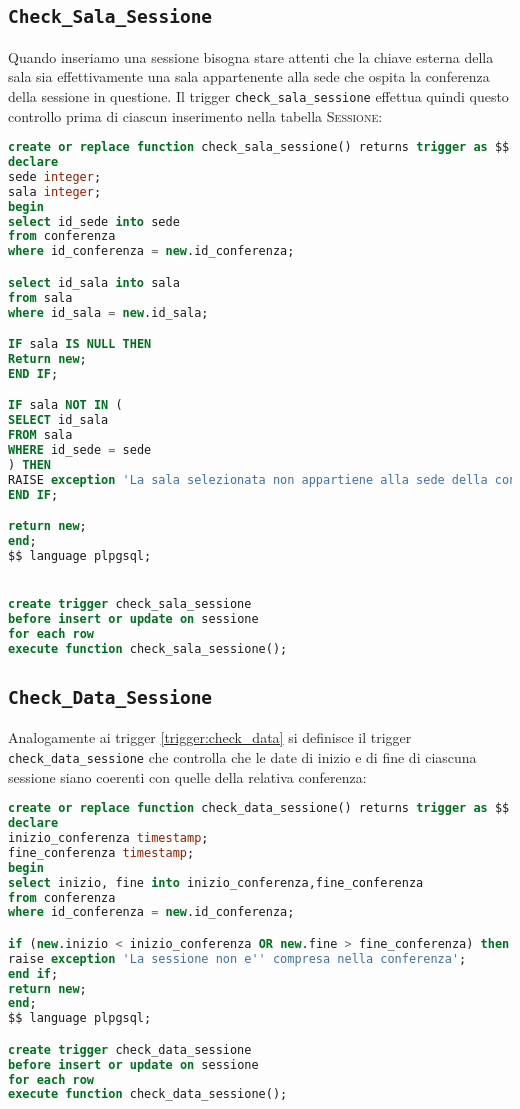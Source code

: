 \subsection{\texttt{Check\_Sala\_Sessione}}
Quando inseriamo una sessione bisogna stare attenti che la chiave esterna della sala sia effettivamente una sala appartenente alla sede che ospita la conferenza della sessione in questione. Il trigger \texttt{check\_sala\_sessione} effettua quindi questo controllo prima di ciascun inserimento nella tabella \textsc{Sessione}:
\begin{lstlisting}[language=SQL, style=mystyle]
create or replace function check_sala_sessione() returns trigger as $$
declare
sede integer;
sala integer;
begin
select id_sede into sede
from conferenza
where id_conferenza = new.id_conferenza;

select id_sala into sala
from sala
where id_sala = new.id_sala;

IF sala IS NULL THEN
Return new;
END IF;

IF sala NOT IN (
SELECT id_sala
FROM sala
WHERE id_sede = sede
) THEN
RAISE exception 'La sala selezionata non appartiene alla sede della conferenza';
END IF;

return new;
end;
$$ language plpgsql;


create trigger check_sala_sessione
before insert or update on sessione
for each row
execute function check_sala_sessione();
\end{lstlisting}
\subsection{\texttt{Check\_Data\_Sessione}}
Analogamente ai trigger \ref{trigger:check_data} si definisce il trigger \texttt{check\_data\_sessione} che controlla che le date di inizio e di fine di ciascuna sessione siano coerenti con quelle della relativa conferenza:
\begin{lstlisting}[language=SQL, style=mystyle, caption={\texttt{check\_data\_sessione}}]
create or replace function check_data_sessione() returns trigger as $$
declare
inizio_conferenza timestamp;
fine_conferenza timestamp;
begin
select inizio, fine into inizio_conferenza,fine_conferenza
from conferenza
where id_conferenza = new.id_conferenza;

if (new.inizio < inizio_conferenza OR new.fine > fine_conferenza) then
raise exception 'La sessione non e'' compresa nella conferenza';
end if;
return new;
end;
$$ language plpgsql;

create trigger check_data_sessione
before insert or update on sessione
for each row
execute function check_data_sessione();
\end{lstlisting}

